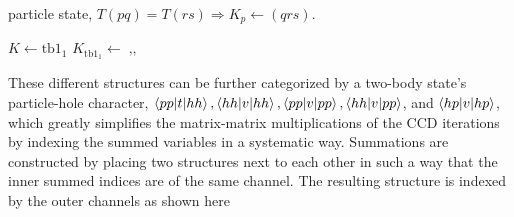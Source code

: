   particle state, $T\left( pq\right)=T\left( rs\right)\Rightarrow
  K_{p}\gets\left( qrs\right)$.
\begin{svgraybox}
  \begin{algorithmic}
     
     \State $K\gets\text{tb1}_{1}$
    \State
    $K_{\text{tb1}_{1}}\gets\mathop{\text{tb1}_{2},\text{tb2}_{1},\text{tb2}_{2}}$
    \EndFor \EndFor \EndFor
  \end{algorithmic}
\end{svgraybox}
  These different structures can be further categorized by a two-body
  state's particle-hole character, $\braket{pp| t |hh}, \braket{hh| v
    |hh}, \braket{pp| v |pp}, \braket{hh| v |pp}$, and $\braket{hp| v
    |hp}$, which greatly simplifies the matrix-matrix multiplications
  of the CCD iterations by indexing the summed variables in a
  systematic way. Summations are constructed by placing two
  structures next to each other in such a way that the inner summed
  indices are of the same channel. The resulting structure is indexed
  by the outer channels as shown here
